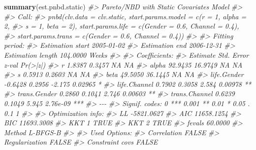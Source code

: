 \documentclass[
]{article}
\newenvironment{Shaded}{\begin{snugshade}}{\end{snugshade}}
\newcommand{\CommentTok}[1]{\textcolor[rgb]{0.56,0.35,0.01}{\textit{#1}}}
\newcommand{\FunctionTok}[1]{\textcolor[rgb]{0.13,0.29,0.53}{\textbf{#1}}}
\newcommand{\NormalTok}[1]{#1}
\begin{document}
\begin{Shaded}
\begin{Highlighting}[]
\FunctionTok{summary}\NormalTok{(est.pnbd.static)}
\CommentTok{\#\textgreater{} Pareto/NBD with Static Covariates  Model }
\CommentTok{\#\textgreater{} }
\CommentTok{\#\textgreater{} Call:}
\CommentTok{\#\textgreater{} pnbd(clv.data = clv.static, start.params.model = c(r = 1, alpha = 2, }
\CommentTok{\#\textgreater{}     s = 1, beta = 2), start.params.life = c(Gender = 0.6, Channel = 0.4), }
\CommentTok{\#\textgreater{}     start.params.trans = c(Gender = 0.6, Channel = 0.4))}
\CommentTok{\#\textgreater{} }
\CommentTok{\#\textgreater{} Fitting period:                                }
\CommentTok{\#\textgreater{} Estimation start  2005{-}01{-}02    }
\CommentTok{\#\textgreater{} Estimation end    2006{-}12{-}31    }
\CommentTok{\#\textgreater{} Estimation length 104.0000 Weeks}
\CommentTok{\#\textgreater{} }
\CommentTok{\#\textgreater{} Coefficients:}
\CommentTok{\#\textgreater{}               Estimate Std. Error  z{-}val Pr(\textgreater{}|z|)    }
\CommentTok{\#\textgreater{} r               1.8387     0.3457     NA       NA    }
\CommentTok{\#\textgreater{} alpha          92.9435    16.9749     NA       NA    }
\CommentTok{\#\textgreater{} s               0.5913     0.2603     NA       NA    }
\CommentTok{\#\textgreater{} beta           49.5050    36.1445     NA       NA    }
\CommentTok{\#\textgreater{} life.Gender    {-}0.6428     0.2956 {-}2.175  0.02965 *  }
\CommentTok{\#\textgreater{} life.Channel    0.7902     0.3058  2.584  0.00978 ** }
\CommentTok{\#\textgreater{} trans.Gender    0.2860     0.1041  2.746  0.00603 ** }
\CommentTok{\#\textgreater{} trans.Channel   0.6239     0.1049  5.945 2.76e{-}09 ***}
\CommentTok{\#\textgreater{} {-}{-}{-}}
\CommentTok{\#\textgreater{} Signif. codes:  0 \textquotesingle{}***\textquotesingle{} 0.001 \textquotesingle{}**\textquotesingle{} 0.01 \textquotesingle{}*\textquotesingle{} 0.05 \textquotesingle{}.\textquotesingle{} 0.1 \textquotesingle{} \textquotesingle{} 1}
\CommentTok{\#\textgreater{} }
\CommentTok{\#\textgreater{} Optimization info:                 }
\CommentTok{\#\textgreater{} LL     {-}5821.0627}
\CommentTok{\#\textgreater{} AIC    11658.1254}
\CommentTok{\#\textgreater{} BIC    11693.3008}
\CommentTok{\#\textgreater{} KKT 1  TRUE      }
\CommentTok{\#\textgreater{} KKT 2  TRUE      }
\CommentTok{\#\textgreater{} fevals 60.0000   }
\CommentTok{\#\textgreater{} Method L{-}BFGS{-}B  }
\CommentTok{\#\textgreater{} }
\CommentTok{\#\textgreater{} Used Options:                     }
\CommentTok{\#\textgreater{} Correlation     FALSE}
\CommentTok{\#\textgreater{} Regularization  FALSE}
\CommentTok{\#\textgreater{} Constraint covs FALSE}
\end{Highlighting}
\end{Shaded}
\end{document}
